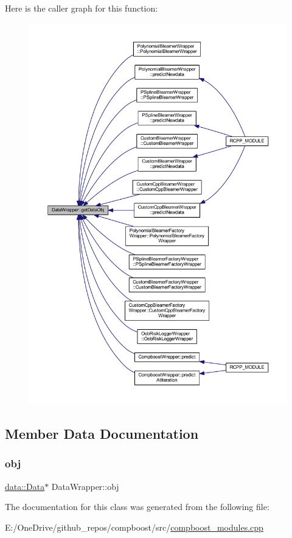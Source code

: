 Here is the caller graph for this function\+:
\nopagebreak
\begin{figure}[H]
\begin{center}
\leavevmode
\includegraphics[width=350pt]{class_data_wrapper_a5e2993dd02f11ae2da8db95f942eca60_icgraph}
\end{center}
\end{figure}


\subsection{Member Data Documentation}
\mbox{\label{class_data_wrapper_aa7e20aa2db84194fd86c032583a93774}} 
\subsubsection{\texorpdfstring{obj}{obj}}
{\footnotesize\ttfamily \mbox{\hyperlink{classdata_1_1_data}{data\+::\+Data}}$\ast$ Data\+Wrapper\+::obj\hspace{0.3cm}{\ttfamily [protected]}}



The documentation for this class was generated from the following file\+:\begin{DoxyCompactItemize}
\item 
E\+:/\+One\+Drive/github\+\_\+repos/compboost/src/\mbox{\hyperlink{compboost__modules_8cpp}{compboost\+\_\+modules.\+cpp}}\end{DoxyCompactItemize}
